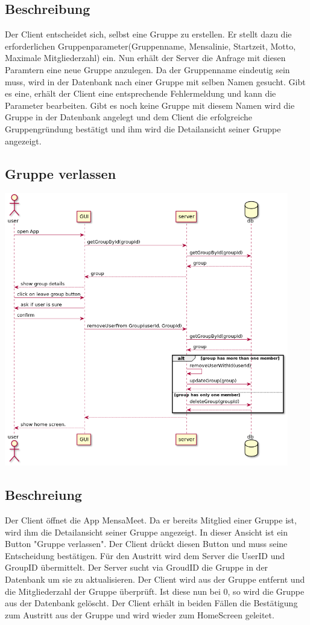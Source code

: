\documentclass[a4paper]{scrreprt}
\begin{document}
\subsection*{Beschreibung}
Der Client entscheidet sich, selbst eine Gruppe zu erstellen. Er stellt dazu die erforderlichen Gruppenparameter(Gruppenname, Mensalinie, Startzeit, Motto, Maximale Mitgliederzahl) ein. Nun erhält der Server die Anfrage mit diesen Paramtern eine neue Gruppe anzulegen. Da der Gruppenname eindeutig sein muss, wird in der Datenbank nach einer Gruppe mit selben Namen gesucht. Gibt es eine, erhält der Client eine entsprechende Fehlermeldung und kann die Parameter bearbeiten. Gibt es noch keine Gruppe mit diesem Namen wird die Gruppe in der Datenbank angelegt und dem Client die erfolgreiche Gruppengründung bestätigt und ihm wird die Detailansicht seiner Gruppe angezeigt.

\newpage
\subsection{Gruppe verlassen}
\begin{center}
	\includegraphics[width=0.93\textwidth]{Sequenzdiagramme/leaveGroupSD.png}
\end{center}

\subsection*{Beschreiung}
Der Client öffnet die App MensaMeet. Da er bereits Mitglied einer Gruppe ist, wird ihm die Detailansicht seiner Gruppe angezeigt.
In dieser Ansicht ist ein Button "Gruppe verlassen". Der Client drückt diesen Button und muss seine Entscheidung bestätigen. Für den Austritt wird dem Server die UserID und GroupID übermittelt. Der Server sucht via GroudID die Gruppe in der Datenbank um sie zu aktualisieren. Der Client wird aus der Gruppe entfernt und die Mitgliederzahl der Gruppe überprüft. Ist diese nun bei 0, so wird die Gruppe aus der Datenbank gelöscht.
Der Client erhält in beiden Fällen die Bestätigung zum Austritt aus der Gruppe und wird wieder zum HomeScreen geleitet.
\end{document}
